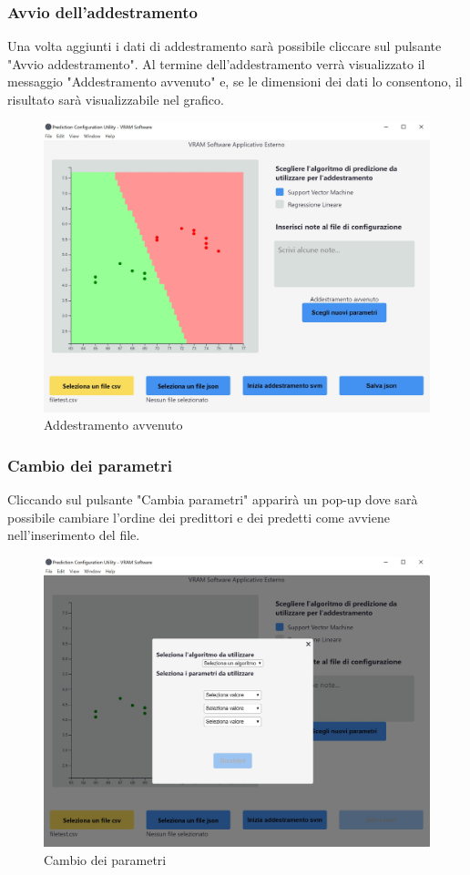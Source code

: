 		\subsubsection{Avvio dell'addestramento}
		Una volta aggiunti i dati di addestramento sarà possibile cliccare sul pulsante "Avvio addestramento". Al termine dell'addestramento verrà visualizzato il messaggio "Addestramento avvenuto" e, se le dimensioni dei dati lo consentono, il risultato sarà visualizzabile nel grafico.
		\mbox{}
		\begin{figure} [H]
			\begin{center}
				\includegraphics[width=\linewidth]{./img/4.jpg}
			\end{center}
			\caption{Addestramento avvenuto}
		\end{figure}
		\mbox{}
		\subsubsection{Cambio dei parametri}
		Cliccando sul pulsante "Cambia parametri" apparirà un pop-up dove sarà possibile cambiare l'ordine dei predittori e dei predetti come avviene nell'inserimento del file.
		\mbox{}
		\begin{figure} [H]
			\begin{center}
				\includegraphics[width=\linewidth]{./img/3.jpg}
			\end{center}
			\caption{Cambio dei parametri}
		\end{figure}
		\mbox{}
